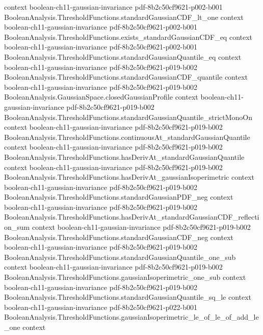 \begin{lemma}
  {context}
  {boolean-ch11-gaussian-invariance}
  {pdf-8b2c50cf9621-p002-b001}
\proofstep
  {BooleanAnalysis.ThresholdFunctions.standardGaussianCDF_lt_one}
  {context}
  {boolean-ch11-gaussian-invariance}
  {pdf-8b2c50cf9621-p002-b001}
\proofstep
  {BooleanAnalysis.ThresholdFunctions.exists_standardGaussianCDF_eq}
  {context}
  {boolean-ch11-gaussian-invariance}
  {pdf-8b2c50cf9621-p002-b001}
\proofstep
  {BooleanAnalysis.ThresholdFunctions.standardGaussianQuantile_eq}
  {context}
  {boolean-ch11-gaussian-invariance}
  {pdf-8b2c50cf9621-p019-b002}
\proofstep
  {BooleanAnalysis.ThresholdFunctions.standardGaussianCDF_quantile}
  {context}
  {boolean-ch11-gaussian-invariance}
  {pdf-8b2c50cf9621-p019-b002}
\proofstep
  {BooleanAnalysis.GaussianSpace.closedGaussianProfile}
  {context}
  {boolean-ch11-gaussian-invariance}
  {pdf-8b2c50cf9621-p019-b002}
\proofstep
  {BooleanAnalysis.ThresholdFunctions.standardGaussianQuantile_strictMonoOn}
  {context}
  {boolean-ch11-gaussian-invariance}
  {pdf-8b2c50cf9621-p019-b002}
\proofstep
  {BooleanAnalysis.ThresholdFunctions.continuousAt_standardGaussianQuantile}
  {context}
  {boolean-ch11-gaussian-invariance}
  {pdf-8b2c50cf9621-p019-b002}
\proofstep
  {BooleanAnalysis.ThresholdFunctions.hasDerivAt_standardGaussianQuantile}
  {context}
  {boolean-ch11-gaussian-invariance}
  {pdf-8b2c50cf9621-p019-b002}
\proofstep
  {BooleanAnalysis.ThresholdFunctions.hasDerivAt_gaussianIsoperimetric}
  {context}
  {boolean-ch11-gaussian-invariance}
  {pdf-8b2c50cf9621-p019-b002}
\proofstep
  {BooleanAnalysis.ThresholdFunctions.standardGaussianPDF_neg}
  {context}
  {boolean-ch11-gaussian-invariance}
  {pdf-8b2c50cf9621-p019-b002}
\proofstep
  {BooleanAnalysis.ThresholdFunctions.hasDerivAt_standardGaussianCDF_reflection_sum}
  {context}
  {boolean-ch11-gaussian-invariance}
  {pdf-8b2c50cf9621-p019-b002}
\proofstep
  {BooleanAnalysis.ThresholdFunctions.standardGaussianCDF_neg}
  {context}
  {boolean-ch11-gaussian-invariance}
  {pdf-8b2c50cf9621-p019-b002}
\proofstep
  {BooleanAnalysis.ThresholdFunctions.standardGaussianQuantile_one_sub}
  {context}
  {boolean-ch11-gaussian-invariance}
  {pdf-8b2c50cf9621-p019-b002}
\proofstep
  {BooleanAnalysis.ThresholdFunctions.gaussianIsoperimetric_one_sub}
  {context}
  {boolean-ch11-gaussian-invariance}
  {pdf-8b2c50cf9621-p019-b002}
\proofstep
  {BooleanAnalysis.ThresholdFunctions.standardGaussianQuantile_sq_le}
  {context}
  {boolean-ch11-gaussian-invariance}
  {pdf-8b2c50cf9621-p022-b001}
\proofstep
  {BooleanAnalysis.ThresholdFunctions.gaussianIsoperimetric_le_of_le_of_add_le_one}
  {context}

\end{lemma}
